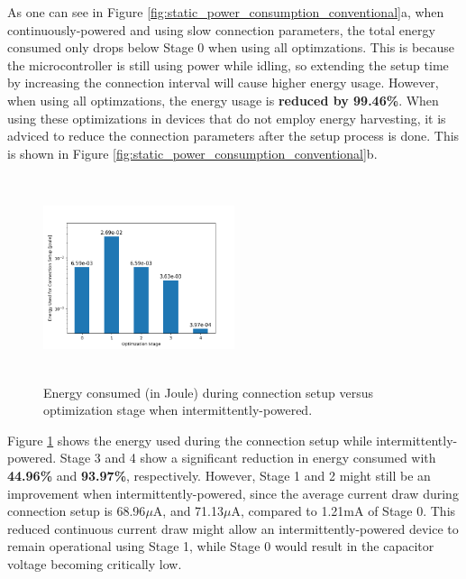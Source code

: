 As one can see in Figure \ref{fig:static_power_consumption_conventional}a, when continuously-powered and using slow connection parameters, the total energy consumed only drops below Stage 0 when using all optimzations. This is because the microcontroller is still using power while idling, so extending the setup time by increasing the connection interval will cause higher energy usage. However, when using all optimzations, the energy usage is \textbf{reduced by 99.46\%}. When using these optimizations in devices that do not employ energy harvesting, it is adviced to reduce the connection parameters after the setup process is done. This is shown in Figure \ref{fig:static_power_consumption_conventional}b.

\begin{figure}[]
    \centering
    \includegraphics[width=0.5\textwidth,height=6cm,keepaspectratio=true]{plots/static_power_consumption_intermittent.png}
    \caption{
        Energy consumed (in Joule) during connection setup versus optimization stage when intermittently-powered. 
    }
    \label{fig:static_power_consumption_intermittent}
\end{figure}

Figure \ref{fig:static_power_consumption_intermittent} shows the energy used during the connection setup while intermittently-powered. Stage 3 and 4 show a significant reduction in energy consumed with \textbf{44.96\%} and \textbf{93.97\%}, respectively. However, Stage 1 and 2 might still be an improvement when intermittently-powered, since the average current draw during connection setup is 68.96$\mu$A, and 71.13$\mu$A, compared to 1.21mA of Stage 0. This reduced continuous current draw might allow an intermittently-powered device to remain operational using Stage 1, while Stage 0 would result in the capacitor voltage becoming critically low.

